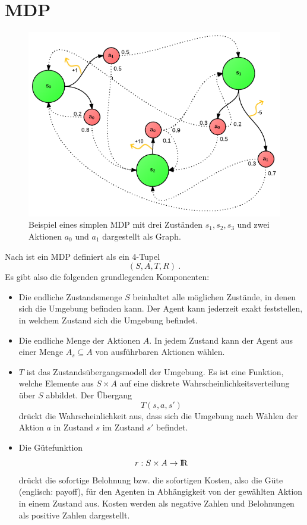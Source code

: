 \documentclass[a4paper]{IEEEtran}
\def\IR{\mathrm{I\hspace{-2pt}R}} %
\begin{document}
\section{MDP}
\begin{figure}[ht]
	\centering
	\includegraphics[scale=0.42]{images/MDP_example.png}
	\caption{Beispiel eines simplen MDP mit drei Zuständen $s_1, s_2, s_3$ und zwei Aktionen $a_0$ und $a_1$ dargestellt als Graph.}
	\label{fig:MDP_example} %
\end{figure}
Nach \cite{cassandra1995acting} ist ein MDP definiert als ein 4-Tupel
\begin{equation}
	(S, A, T, R) \ .
\end{equation}
Es gibt also die folgenden grundlegenden Komponenten:
\begin{itemize}
	\item Die endliche Zustandsmenge $S$ beinhaltet alle möglichen Zustände, in denen sich die Umgebung befinden kann. Der Agent kann jederzeit exakt feststellen, in welchem Zustand sich die Umgebung befindet.
	\item Die endliche Menge der Aktionen $A$. In jedem Zustand kann der Agent aus einer Menge $A_s \subseteq A$ von ausführbaren Aktionen wählen.
	\item $T$ ist das Zustandsübergangsmodell der Umgebung. Es ist eine Funktion, welche Elemente aus $S \times A$ auf eine diskrete Wahrscheinlichkeitsverteilung über $S$ abbildet. Der Übergang
	\begin{equation}
		T(s, a, s')
	\end{equation}
	drückt die Wahrscheinlichkeit aus, dass sich die Umgebung nach Wählen der Aktion $a$ in Zustand $s$ im Zustand $s'$ befindet.
	\item Die Gütefunktion
	\begin{equation}
		r: S \times A \rightarrow \IR
		\label{eq:payoff}
	\end{equation}
	drückt die sofortige Belohnung bzw. die sofortigen Kosten, also die Güte (englisch: payoff), für den Agenten in Abhängigkeit von der gewählten Aktion in einem Zustand aus. Kosten werden als negative Zahlen und Belohnungen als positive Zahlen dargestellt.
\end{itemize}
\end{document}
